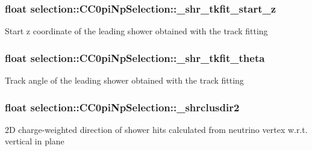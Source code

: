 \subsubsection[{\texorpdfstring{\+\_\+shr\+\_\+tkfit\+\_\+start\+\_\+z}{_shr_tkfit_start_z}}]{\setlength{\rightskip}{0pt plus 5cm}float selection\+::\+C\+C0pi\+Np\+Selection\+::\+\_\+shr\+\_\+tkfit\+\_\+start\+\_\+z\hspace{0.3cm}{\ttfamily [private]}}\hypertarget{classselection_1_1CC0piNpSelection_a4d3591a8bb7abd9e320f35ca3bf311c2}{}\label{classselection_1_1CC0piNpSelection_a4d3591a8bb7abd9e320f35ca3bf311c2}
Start z coordinate of the leading shower obtained with the track fitting 
\subsubsection[{\texorpdfstring{\+\_\+shr\+\_\+tkfit\+\_\+theta}{_shr_tkfit_theta}}]{\setlength{\rightskip}{0pt plus 5cm}float selection\+::\+C\+C0pi\+Np\+Selection\+::\+\_\+shr\+\_\+tkfit\+\_\+theta\hspace{0.3cm}{\ttfamily [private]}}\hypertarget{classselection_1_1CC0piNpSelection_a11df391e482434665c389423bbb9ec5d}{}\label{classselection_1_1CC0piNpSelection_a11df391e482434665c389423bbb9ec5d}
Track angle of the leading shower obtained with the track fitting 
\subsubsection[{\texorpdfstring{\+\_\+shrclusdir2}{_shrclusdir2}}]{\setlength{\rightskip}{0pt plus 5cm}float selection\+::\+C\+C0pi\+Np\+Selection\+::\+\_\+shrclusdir2\hspace{0.3cm}{\ttfamily [private]}}\hypertarget{classselection_1_1CC0piNpSelection_a62af9f6d72d725a3109705e27e635d29}{}\label{classselection_1_1CC0piNpSelection_a62af9f6d72d725a3109705e27e635d29}
2D charge-\/weighted direction of shower hits calculated from neutrino vertex w.\+r.\+t. vertical in plane 
